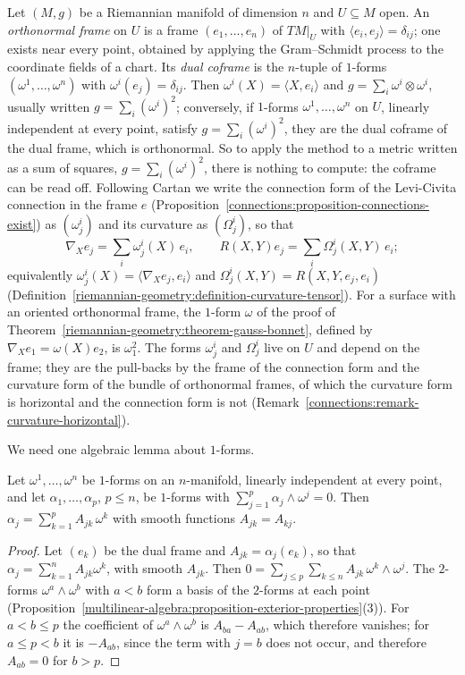 Let $(M, g)$ be a Riemannian manifold of dimension $n$ and $U \subseteq M$ open. An \emph{orthonormal frame} on $U$ is a frame $(e_1, \ldots, e_n)$ of $TM|_U$ with
$\langle e_i, e_j\rangle = \delta_{ij}$; one exists near every point, obtained by applying the Gram--Schmidt process to the coordinate fields of a chart. Its \emph{dual coframe} is the
$n$-tuple of $1$-forms $(\omega^1, \ldots, \omega^n)$ with $\omega^i(e_j) = \delta_{ij}$. Then $\omega^i(X) = \langle X, e_i\rangle$ and $g = \sum_i\omega^i \otimes \omega^i$, usually written
$g = \sum_i(\omega^i)^2$; conversely, if $1$-forms $\omega^1, \ldots, \omega^n$ on $U$, linearly independent at every point, satisfy $g = \sum_i(\omega^i)^2$, they are the dual coframe of the
dual frame, which is orthonormal. So to apply the method to a metric written as a sum of squares, $g = \sum_i(\omega^i)^2$, there is nothing to compute: the coframe can be read off.
Following Cartan we write the connection form of the Levi-Civita connection in the frame $e$ (Proposition~\ref{connections:proposition-connections-exist}) as $(\omega^i_j)$ and its curvature
as $(\Omega^i_j)$, so that
\[
\nabla_Xe_j = \sum_i\omega^i_j(X)\,e_i, \qquad R(X, Y)e_j = \sum_i\Omega^i_j(X, Y)\,e_i ;
\]
equivalently $\omega^i_j(X) = \langle\nabla_Xe_j, e_i\rangle$ and $\Omega^i_j(X, Y) = R(X, Y, e_j, e_i)$ (Definition~\ref{riemannian-geometry:definition-curvature-tensor}). For a surface
with an oriented orthonormal frame, the $1$-form $\omega$ of the proof of Theorem~\ref{riemannian-geometry:theorem-gauss-bonnet}, defined by $\nabla_Xe_1 = \omega(X)e_2$, is $\omega^2_1$. The forms $\omega^i_j$ and $\Omega^i_j$ live on $U$ and depend on the frame; they are the pull-backs by the frame of
the connection form and the curvature form of the bundle of orthonormal frames, of which the curvature form is horizontal and the connection form is not
(Remark~\ref{connections:remark-curvature-horizontal}).

We need one algebraic lemma about $1$-forms.

\begin{lemma}\label{riemannian-geometry:lemma-cartan}
Let $\omega^1, \ldots, \omega^n$ be $1$-forms on an $n$-manifold, linearly independent at every point, and let $\alpha_1, \ldots, \alpha_p$, $p \leq n$, be $1$-forms with
$\sum_{j=1}^p\alpha_j \wedge \omega^j = 0$. Then $\alpha_j = \sum_{k=1}^pA_{jk}\,\omega^k$ with smooth functions $A_{jk} = A_{kj}$.
\end{lemma}

\begin{proof}
Let $(e_k)$ be the dual frame and $A_{jk} = \alpha_j(e_k)$, so that $\alpha_j = \sum_{k=1}^nA_{jk}\omega^k$, with smooth $A_{jk}$. Then
$0 = \sum_{j \leq p}\sum_{k \leq n}A_{jk}\,\omega^k \wedge \omega^j$. The $2$-forms $\omega^a \wedge \omega^b$ with $a < b$ form a basis of the $2$-forms at each point
(Proposition~\ref{multilinear-algebra:proposition-exterior-properties}(3)). For $a < b \leq p$ the coefficient of $\omega^a \wedge \omega^b$ is $A_{ba} - A_{ab}$, which therefore vanishes; for
$a \leq p < b$ it is $-A_{ab}$, since the term with $j = b$ does not occur, and therefore $A_{ab} = 0$ for $b > p$.
\end{proof}

